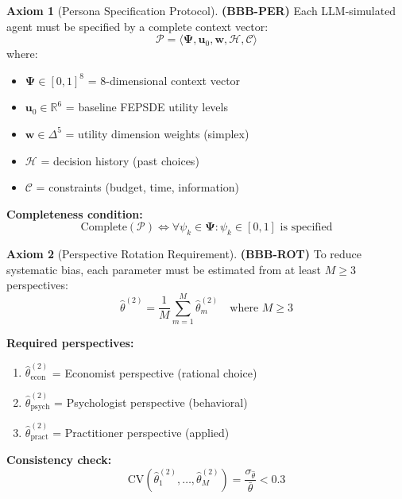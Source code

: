 \documentclass[11pt,a4paper]{article}
\theoremstyle{definition}
\newtheorem{axiom}{Axiom}[section]
\begin{document}
\begin{axiom}[Persona Specification Protocol]
\label{ax:bbb-per}
\textbf{(BBB-PER)} Each LLM-simulated agent must be specified by a complete 
context vector:
\begin{equation}
\mathcal{P} = \langle \boldsymbol{\Psi}, \mathbf{u}_0, \mathbf{w}, \mathcal{H}, \mathcal{C} \rangle
\end{equation}
where:
\begin{itemize}
    \item $\boldsymbol{\Psi} \in [0,1]^8$ = 8-dimensional context vector
    \item $\mathbf{u}_0 \in \mathbb{R}^6$ = baseline FEPSDE utility levels
    \item $\mathbf{w} \in \Delta^5$ = utility dimension weights (simplex)
    \item $\mathcal{H}$ = decision history (past choices)
    \item $\mathcal{C}$ = constraints (budget, time, information)
\end{itemize}

\textbf{Completeness condition:}
\begin{equation}
\text{Complete}(\mathcal{P}) \Leftrightarrow \forall \psi_k \in \boldsymbol{\Psi}: \psi_k \in [0,1] \text{ is specified}
\end{equation}
\end{axiom}

\begin{axiom}[Perspective Rotation Requirement]
\label{ax:bbb-rot}
\textbf{(BBB-ROT)} To reduce systematic bias, each parameter must be estimated 
from at least $M \geq 3$ perspectives:
\begin{equation}
\hat{\theta}^{(2)} = \frac{1}{M} \sum_{m=1}^{M} \hat{\theta}^{(2)}_m \quad \text{where } M \geq 3
\end{equation}

\textbf{Required perspectives:}
\begin{enumerate}
    \item $\hat{\theta}^{(2)}_{\text{econ}}$ = Economist perspective (rational choice)
    \item $\hat{\theta}^{(2)}_{\text{psych}}$ = Psychologist perspective (behavioral)
    \item $\hat{\theta}^{(2)}_{\text{pract}}$ = Practitioner perspective (applied)
\end{enumerate}

\textbf{Consistency check:}
\begin{equation}
\text{CV}(\hat{\theta}^{(2)}_1, \ldots, \hat{\theta}^{(2)}_M) = \frac{\sigma_{\hat{\theta}}}{\bar{\theta}} < 0.3
\end{equation}
\end{axiom}
\end{document}
